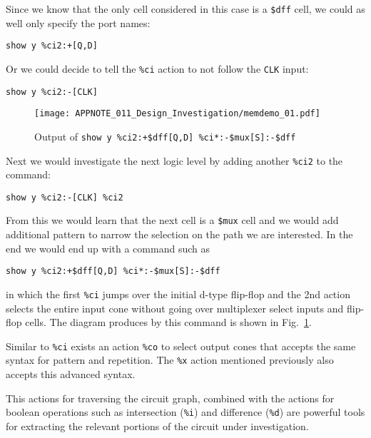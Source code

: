 \documentclass[9pt,technote,a4paper]{IEEEtran}
\begin{document}
Since we know that the only cell considered in this case is a {\tt \$dff} cell,
we could as well only specify the port names:

\begin{verbatim}
show y %ci2:+[Q,D]
\end{verbatim}

Or we could decide to tell the {\tt \%ci} action to not follow the {\tt CLK} input:

\begin{verbatim}
show y %ci2:-[CLK]
\end{verbatim}

\begin{figure}[b]
\texttt{[image: APPNOTE\_011\_Design\_Investigation/memdemo\_01.pdf]} \\
\caption{Output of {\tt show y \%ci2:+\$dff[Q,D] \%ci*:-\$mux[S]:-\$dff}}
\label{memdemo_01}
\end{figure}

Next we would investigate the next logic level by adding another {\tt \%ci2} to
the command:

\begin{verbatim}
show y %ci2:-[CLK] %ci2
\end{verbatim}

From this we would learn that the next cell is a {\tt \$mux} cell and we would add additional
pattern to narrow the selection on the path we are interested. In the end we would end up
with a command such as

\begin{verbatim}
show y %ci2:+$dff[Q,D] %ci*:-$mux[S]:-$dff
\end{verbatim}

in which the first {\tt \%ci} jumps over the initial d-type flip-flop and the
2nd action selects the entire input cone without going over multiplexer select
inputs and flip-flop cells. The diagram produces by this command is shown in
Fig.~\ref{memdemo_01}.

\medskip

Similar to {\tt \%ci} exists an action {\tt \%co} to select output cones that
accepts the same syntax for pattern and repetition. The {\tt \%x} action mentioned
previously also accepts this advanced syntax.

This actions for traversing the circuit graph, combined with the actions for
boolean operations such as intersection ({\tt \%i}) and difference ({\tt \%d})
are powerful tools for extracting the relevant portions of the circuit under
investigation.
\end{document}
